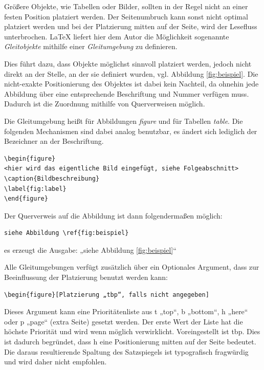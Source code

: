Größere Objekte, wie Tabellen oder Bilder, sollten in der Regel nicht an einer festen Position platziert werden.
Der Seitenumbruch kann sonst nicht optimal platziert werden und bei der Platzierung mitten auf der Seite, wird der Lesefluss unterbrochen.
\LaTeX{} liefert hier dem Autor die Möglichkeit sogenannte \emph{Gleitobjekte} mithilfe einer \emph{Gleitumgebung} zu definieren.

Dies führt dazu, dass Objekte möglichst sinnvoll platziert werden, jedoch nicht direkt an der Stelle, an der sie definiert wurden, vgl. Abbildung \ref{fig:beispiel}.
Die nicht-exakte Positionierung des Objektes ist dabei kein Nachteil, da ohnehin jede Abbildung über eine entsprechende Beschriftung und Nummer verfügen muss.
Dadurch ist die Zuordnung mithilfe von Querverweisen möglich.

Die Gleitumgebung heißt für Abbildungen \emph{figure} und für Tabellen \emph{table}. Die folgenden Mechanismen sind dabei analog benutzbar, es ändert sich lediglich der Bezeichner an der Beschriftung.

\begin{verbatim}
\begin{figure}
<hier wird das eigentliche Bild eingefügt, siehe Folgeabschnitt>
\caption{Bildbeschreibung}
\label{fig:label}
\end{figure}
\end{verbatim}


Der Querverweis auf die Abbildung ist dann folgendermaßen möglich:
\begin{verbatim}
siehe Abbildung \ref{fig:beispiel}
\end{verbatim}
es erzeugt die Ausgabe: „siehe Abbildung \ref{fig:beispiel}“

Alle Gleitumgebungen verfügt zusätzlich über ein Optionales Argument, dass zur Beeinflussung der Platzierung benutzt werden kann:
\begin{verbatim}
\begin{figure}[Platzierung „tbp“, falls nicht angegeben]
\end{verbatim}

Dieses Argument kann eine Prioritätenliste aus t „top“, b „bottom“, h „here“ oder p „page“ (extra
Seite) gesetzt werden. Der erste Wert der Liste hat die höchste Priorität und wird wenn möglich verwirklicht.
Voreingestellt ist tbp. Dies ist dadurch begründet, dass h eine Positionierung mitten auf der Seite
bedeutet. Die daraus resultierende Spaltung des Satzspiegels ist typografisch fragwürdig und wird daher nicht empfohlen.


